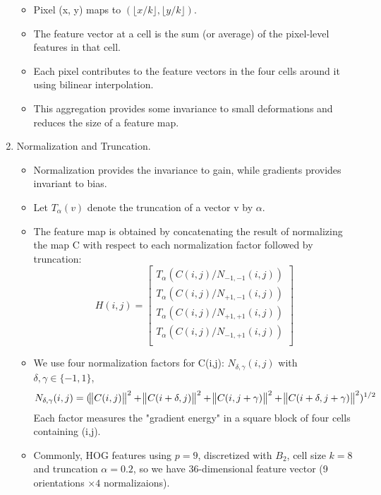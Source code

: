 \documentclass[12pt]{article}
\numberwithin{equation}{section}
\begin{document}
\begin{enumerate}
\begin{itemize}
			\item Pixel (x, y) maps to $(\lfloor{x/k}\rfloor, \lfloor{y/k}\rfloor)$.
			\item The feature vector at a cell is the sum (or average) of the pixel-level features in that cell.
			\item Each pixel contributes to the feature vectors in the four cells around it using 
			bilinear interpolation.
			\item This aggregation provides some invariance to small deformations and reduces the size
			of a feature map.
		\end{itemize}
	\item Normalization and Truncation.
		\begin{itemize}
			\item Normalization provides the invariance to gain, while gradients provides invariant to bias.
			\item Let $T_{\alpha}(v)$ denote the truncation of a vector  v by $\alpha$.
			\item The feature map is obtained by concatenating the result of normalizing the map C with respect
			 to each normalization factor followed by truncation:
			 	\begin{equation}
					H(i,j)=
					\begin{bmatrix}
						T_{\alpha}(C(i,j)/N_{-1, -1}(i,j)) \\
						T_{\alpha}(C(i,j)/N_{+1, -1}(i,j)) \\
						T_{\alpha}(C(i,j)/N_{+1, +1}(i,j)) \\
						T_{\alpha}(C(i,j)/N_{-1, +1}(i,j)) \\
					\end{bmatrix}
				\end{equation}
			\item We use four normalization factors for C(i,j): $N_{\delta, \gamma}(i,j)$ with 
			$\delta, \gamma \in \{-1, 1\}$,
				\begin{equation}
					N_{\delta, \gamma}(i,j)=(\norm{C(i,j)}^2+\norm{C(i+\delta,j)}^2+
									\norm{C(i,j+\gamma)}^2+\norm{C(i+\delta,j+\gamma)}^2)^{1/2}
				\end{equation}
			Each factor measures the "gradient energy" in a square block of four cells containing (i,j).
			\item Commonly, HOG features using $p=9$, discretized with $B_2$, cell size $k=8$ and truncation 
			$\alpha = 0.2$, so we have 36-dimensional feature vector (9 orientations $ \times 4$ 
			normalizaions).
		\end{itemize}		

\end{enumerate}
\end{document}
